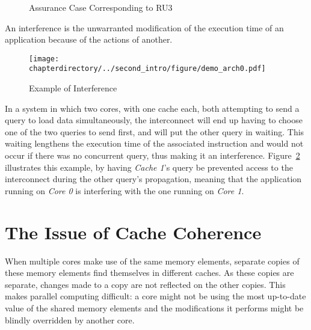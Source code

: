 \begin{figure}[hbt!]
\resizebox{\textwidth}{!}{}
\caption{Assurance Case Corresponding to RU3}
\label{fig:cast32a:ru3_assurance_case}
\end{figure}

\begin{definition}[Interference]
An interference is the unwarranted modification of the execution time of an
application because of the actions of another.
\end{definition}

\begin{figure}[hbt!]
\begin{center}
\texttt{[image: \\chapterdirectory/../second\_intro/figure/demo\_arch0.pdf]}
\end{center}
\caption{Example of Interference}
\label{fig:second_intro:interference_example}
\end{figure}

\begin{example}
\label{ex:second_intro:interference}
In a system in which two cores, with one cache each, both attempting to send a
query to load data simultaneously, the interconnect will end up having to
choose one of the two queries to send first, and will put the other query in
waiting. This waiting lengthens the execution time of the associated
instruction and would not occur if there was no concurrent query, thus making
it an interference. Figure~\ref{fig:second_intro:interference_example}
illustrates this example, by having \textit{Cache 1}'s query be prevented
access to the interconnect during the other query's propagation, meaning that
the application running on \textit{Core 0} is interfering with the one running
on \textit{Core 1}.
\end{example}

%

\section{The Issue of Cache Coherence}
\label{sec:intro:prob_statement}
When multiple cores make use of the same memory elements, separate copies of
these memory elements find themselves in different caches. As these copies are
separate, changes made to a copy are not reflected on the other copies. This
makes parallel computing difficult: a core might not be using the most
up-to-date value of the shared memory elements and the modifications it performs
might be blindly overridden by another core.

